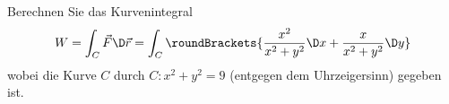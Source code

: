 \begin{atiTask}[
  title = Wegintegrale berechnen
]
  Berechnen Sie das Kurvenintegral
\begin{equation*}
W=\int_C \vec{F} \D\vec{r}=\int _C\roundBrackets{\frac{x^2}{x^2+y^2}\D x+\frac{x}{x^2+y^2}\D y}
\end{equation*}
wobei die Kurve $C$ durch $C: x^2+y^2=9$ (entgegen dem Uhrzeigersinn) gegeben ist.
\end{atiTask}
